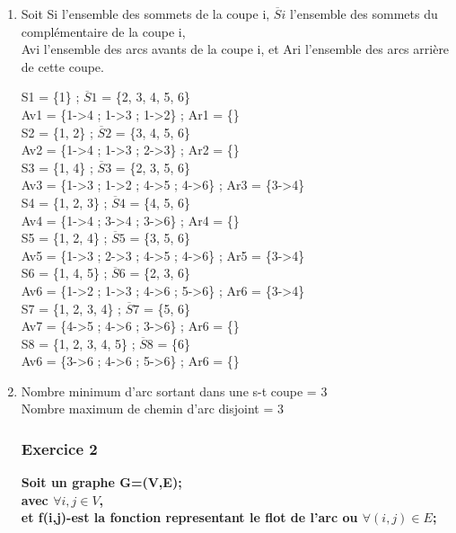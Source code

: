 \documentclass[]{article}
\begin{document}
\begin{enumerate}
\item Soit Si l'ensemble des sommets de la coupe i, $\overline Si$ l'ensemble des sommets du complémentaire de la coupe i, \\
Avi l'ensemble des arcs avants de la coupe i, et Ari l'ensemble des arcs arrière de cette coupe.\\
\begin{center}
S1 = \{1\} ; $\overline S1$ = \{2, 3, 4, 5, 6\}\\ 
Av1 = \{1->4 ; 1->3 ; 1->2\} ; Ar1 = \{\}\\
S2 = \{1, 2\} ; $\overline S2$ = \{3, 4, 5, 6\}\\
Av2 = \{1->4 ; 1->3 ; 2->3\} ; Ar2 = \{\}\\ 
S3 = \{1, 4\} ; $\overline S3$ = \{2, 3, 5, 6\}\\
Av3 = \{1->3 ; 1->2 ; 4->5 ; 4->6\} ; Ar3 = \{3->4\}\\
S4 = \{1, 2, 3\} ; $\overline S4$ = \{4, 5, 6\}\\ 
Av4 = \{1->4 ; 3->4 ; 3->6\} ; Ar4 = \{\}\\
S5 = \{1, 2, 4\} ; $\overline S5$ = \{3, 5, 6\}\\
Av5 = \{1->3 ; 2->3 ; 4->5 ; 4->6\} ; Ar5 = \{3->4\}\\
S6 = \{1, 4, 5\} ; $\overline S6$ = \{2, 3, 6\}\\
Av6 = \{1->2 ; 1->3 ; 4->6 ; 5->6\} ; Ar6 = \{3->4\}\\ 
S7 = \{1, 2, 3, 4\} ; $\overline S7$ = \{5, 6\}\\ 
Av7 = \{4->5 ; 4->6 ; 3->6\} ; Ar6 = \{\}\\ 
S8 = \{1, 2, 3, 4, 5\} ; $\overline S8$ = \{6\}\\
Av6 = \{3->6 ; 4->6 ; 5->6\} ; Ar6 = \{\}\\
\end{center}


\item Nombre minimum d'arc sortant dans une s-t coupe = 3\\
  Nombre maximum de chemin d'arc disjoint = 3\\


\subsubsection{Exercice 2}

\textbf{Soit un graphe G=(V,E);\\avec $\forall i,j \in V$,\\
et f(i,j)-est la fonction representant le flot de l'arc ou $\forall (i,j)\in E$;\\}


\end{enumerate}
\end{document}
